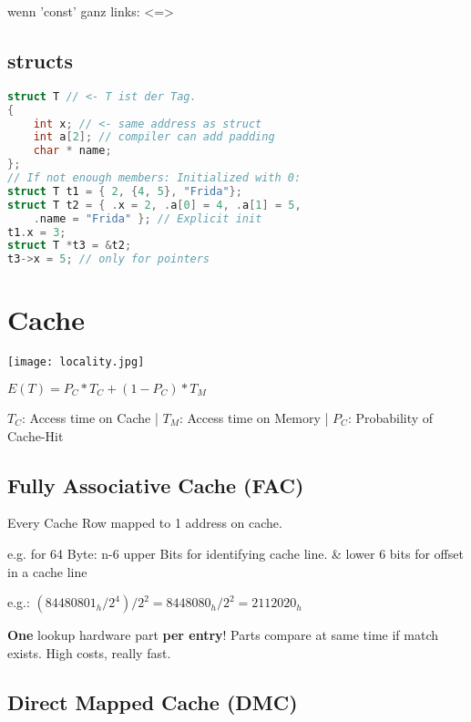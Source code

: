 \begin{multicols*}{4}
wenn 'const' ganz links:  <=> 

\subsection{structs}
\begin{lstlisting}[language=c]
struct T // <- T ist der Tag.
{
    int x; // <- same address as struct
    int a[2]; // compiler can add padding
    char * name;
};
// If not enough members: Initialized with 0:
struct T t1 = { 2, {4, 5}, "Frida"};
struct T t2 = { .x = 2, .a[0] = 4, .a[1] = 5,
    .name = "Frida" }; // Explicit init
t1.x = 3;
struct T *t3 = &t2;
t3->x = 5; // only for pointers
\end{lstlisting}

\section{Cache}
\texttt{[image: locality.jpg]}

\(E(T) = P_C * T_C + (1 - P_C )* T_M\)

\(T_C\): Access time on Cache |
\(T_M\): Access time on Memory |
\(P_C\): Probability of Cache-Hit

\subsection{Fully Associative Cache (FAC)}
Every Cache Row mapped to 1 address on cache.

e.g. for 64 Byte: n-6 upper Bits for identifying cache line. \& lower 6 bits for offset in a cache line

e.g.: \((84480801_h / 2^4) / 2^2 = 8448080_h / 2^2 = 2112020_h\)

\textbf{One} lookup hardware part \textbf{per entry}! Parts compare at same time if match exists. High costs, really fast.




\subsection{Direct Mapped Cache (DMC)}


\end{multicols*}
